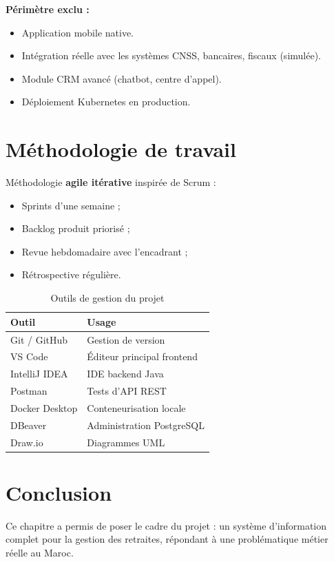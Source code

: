 \documentclass[12pt,a4paper,oneside]{report}
\begin{document}
\textbf{Périmètre exclu :}
\begin{itemize}
    \item Application mobile native.
    \item Intégration réelle avec les systèmes CNSS, bancaires, fiscaux (simulée).
    \item Module CRM avancé (chatbot, centre d'appel).
    \item Déploiement Kubernetes en production.
\end{itemize}

\section{Méthodologie de travail}
Méthodologie \textbf{agile itérative} inspirée de Scrum :
\begin{itemize}
    \item Sprints d'une semaine ;
    \item Backlog produit priorisé ;
    \item Revue hebdomadaire avec l'encadrant ;
    \item Rétrospective régulière.
\end{itemize}

\begin{table}[H]
\centering
\caption{Outils de gestion du projet}
\begin{tabular}{ll}
\toprule
\textbf{Outil} & \textbf{Usage} \\
\midrule
Git / GitHub & Gestion de version \\
VS Code & Éditeur principal frontend \\
IntelliJ IDEA & IDE backend Java \\
Postman & Tests d'API REST \\
Docker Desktop & Conteneurisation locale \\
DBeaver & Administration PostgreSQL \\
Draw.io & Diagrammes UML \\
\bottomrule
\end{tabular}
\end{table}

\section{Conclusion}
Ce chapitre a permis de poser le cadre du projet : un système d'information complet pour la gestion des retraites, répondant à une problématique métier réelle au Maroc.
\end{document}
